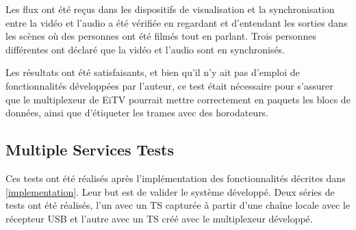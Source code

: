 \documentclass[12pt,a4paper]{article}
\begin{document}



Les flux ont été reçus dans les dispositifs de visualisation et la synchronisation entre la vidéo et l'audio a été vérifiée en regardant et d'entendant les sorties dans les scènes où des personnes ont été filmés tout en parlant. Trois personnes différentes ont déclaré que la vidéo et l'audio sont en synchronisés.

Les résultats ont été satisfaisants, et bien qu'il n'y ait pas d'emploi de fonctionnalités développées par l'auteur, ce test était nécessaire pour s'assurer que le multiplexeur de EiTV pourrait mettre  correctement en paquets les blocs de données, ainsi que d'étiqueter les trames avec des horodateurs.

\subsection{Multiple Services Tests}


Ces tests ont été réalisés après l'implémentation des fonctionnalités décrites dans \autoref{implementation}. Leur but est de valider le système développé. Deux séries de tests ont été réalisés, l'un avec un TS capturée à partir d'une chaîne locale avec le récepteur USB et l'autre avec un TS créé avec le multiplexeur développé.
\end{document}
